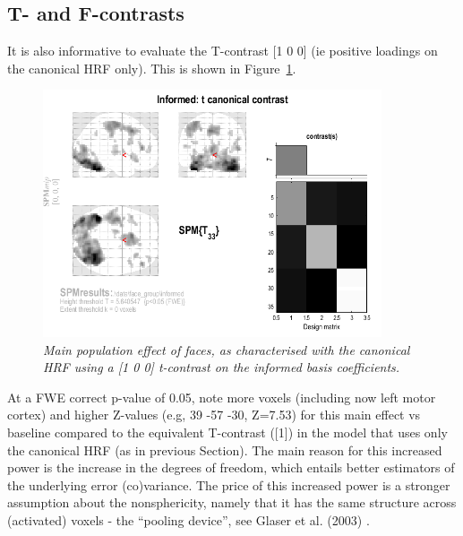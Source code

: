 \subsection{T- and F-contrasts}

It is also informative to evaluate the T-contrast [1 0 0] (ie positive loadings on the canonical HRF only). This is shown in Figure~\ref{informed_t}.

\begin{figure}
\begin{center}
\includegraphics[width=100mm]{faces_group/informed_t}
\caption{\em Main population effect of faces, as characterised with the canonical HRF using a [1 0 0] t-contrast on the informed basis coefficients. \label{informed_t}}
\end{center}
\end{figure}
At a FWE correct p-value of 0.05, note more voxels (including now left motor cortex) and higher Z-values (e.g, 39 -57 -30, Z=7.53) for this main effect vs baseline compared to the equivalent T-contrast ([1]) in the model that uses only the canonical HRF (as in previous Section). 
The main reason for this increased power is the increase in the degrees of freedom, which entails better estimators of the underlying error (co)variance. The price of this increased power is a stronger assumption about the nonsphericity, namely that it has the same structure across (activated) voxels - the ``pooling device'', see Glaser et al. (2003) \cite{daniel_hbf2}.

